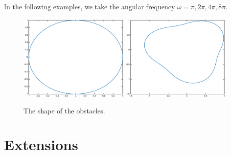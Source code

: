 {In the following examples, we take the angular frequency $\omega= \pi,2\pi,4\pi,8\pi$.

\begin{figure}[htbp]
	\centering
	\includegraphics[width=0.48\textwidth]{./Img/figure_sc_elastic/circle.eps}
	\includegraphics[width=0.48\textwidth]{./Img/figure_sc_elastic/pear.eps}
	\caption{The shape of the obstacles.}\label{shape}
\end{figure}


\section{Extensions}

}
